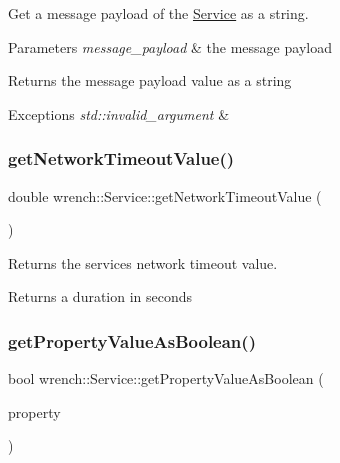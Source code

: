 Get a message payload of the \hyperlink{classwrench_1_1_service}{Service} as a string. 


\begin{DoxyParams}{Parameters}
{\em message\+\_\+payload} & the message payload \\
\hline
\end{DoxyParams}
\begin{DoxyReturn}{Returns}
the message payload value as a string
\end{DoxyReturn}

\begin{DoxyExceptions}{Exceptions}
{\em std\+::invalid\+\_\+argument} & \\
\hline
\end{DoxyExceptions}
\mbox{\label{classwrench_1_1_service_a113a90bcf686c79df677bb6dab61fc4e}} 
\subsubsection{\texorpdfstring{get\+Network\+Timeout\+Value()}{getNetworkTimeoutValue()}}
{\footnotesize\ttfamily double wrench\+::\+Service\+::get\+Network\+Timeout\+Value (\begin{DoxyParamCaption}{ }\end{DoxyParamCaption})}



Returns the service\textquotesingle{}s network timeout value. 

\begin{DoxyReturn}{Returns}
a duration in seconds 
\end{DoxyReturn}
\mbox{\label{classwrench_1_1_service_aaacc5398b7fa16262348446006dba884}} 
\subsubsection{\texorpdfstring{get\+Property\+Value\+As\+Boolean()}{getPropertyValueAsBoolean()}}
{\footnotesize\ttfamily bool wrench\+::\+Service\+::get\+Property\+Value\+As\+Boolean (\begin{DoxyParamCaption}\item[{std\+::string}]{property }\end{DoxyParamCaption})}



